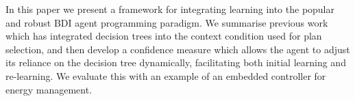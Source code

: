 
In this paper we present a
framework for integrating learning into the popular and robust BDI
agent programming paradigm. We summarise
previous work which has integrated decision trees into the context
condition used for plan selection, and then develop a confidence
measure which allows the agent to adjust its reliance on the
decision tree dynamically, facilitating both initial learning and
re-learning. We evaluate this with an example of an embedded controller
for energy management.

%
%
%
%

